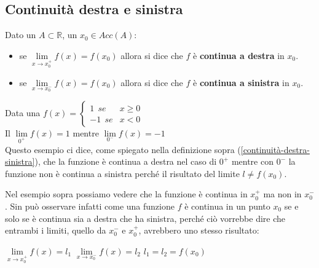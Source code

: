 \subsection{Continuità destra e sinistra}
\begin{definition}\label{continuità-destra-sinistra}
Dato un $A \subset \mathbb{R}$, un $x_0 \in Acc(A)$:
\begin{itemize}
    \item se $\lim\limits_{x \to x_0^+}f(x) = f(x_0)$ allora si dice che $f$ è \textbf{continua a destra} in $x_0$.
    \item se $\lim\limits_{x \to x_0^-}f(x) = f(x_0)$ allora si dice che $f$ è \textbf{continua a sinistra} in $x_0$.
\end{itemize}
\end{definition}

\begin{example}
Data una $
f(x) = \begin{cases}
    1 \: \: se & x \geq 0 \\
    -1 \: \: se & x < 0
\end{cases}$\\
Il $\lim\limits_{0^+}f(x) = 1$ mentre $\lim\limits_{0^-}f(x) = -1$\\
Questo esempio ci dice, come spiegato nella definizione sopra (\ref{continuità-destra-sinistra}), che la funzione è continua a destra nel caso di $0^+$ mentre con $0^-$ la funzione non è continua a sinistra perché il risultato del limite $l \neq f(x_0)$. 
\end{example}
\begin{observation}
    Nel esempio sopra possiamo vedere che la funzione è continua in $x_0^+$ ma non in $x_0^-$. Sin può osservare infatti come una funzione $f$ è continua in un punto $x_0$ se e solo se è continua sia a destra che ha sinistra, perché ciò vorrebbe dire che entrambi i limiti, quello da $x_0^-$ e $x_0^+$, avrebbero uno stesso risultato:
    \begin{center}
        $\lim\limits_{x\to x_0^+}f(x) = l_1$ \:\:\: $\lim\limits_{x\to x_0^-}f(x) = l_2$ \:\:\: $l_1 = l_2 = f(x_0)$
    \end{center}
\end{observation}

